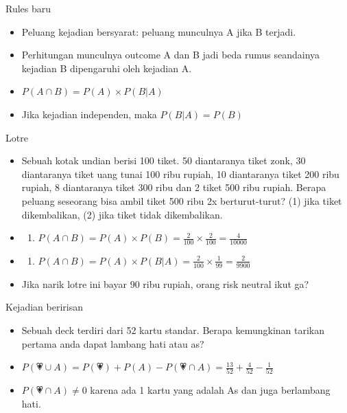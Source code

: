 \documentclass[
  ignorenonframetext,
]{beamer}
\providecommand{\tightlist}{%
  \setlength{\itemsep}{0pt}\setlength{\parskip}{0pt}}\usepackage{longtable,booktabs,array}
\begin{document}
\begin{frame}{Rules baru}
\label{rules-baru-1}
\begin{itemize}[<+->]
\item
  Peluang kejadian bersyarat: peluang munculnya A jika B terjadi.
\item
  Perhitungan munculnya outcome A dan B jadi beda rumus seandainya
  kejadian B dipengaruhi oleh kejadian A.
\item
  \(P(A \cap B)=P(A) \times P(B|A)\)
\item
  Jika kejadian independen, maka \(P(B|A)= P(B)\)
\end{itemize}
\end{frame}

\begin{frame}{Lotre}
\label{lotre}
\begin{itemize}[<+->]
\item
  Sebuah kotak undian berisi 100 tiket. 50 diantaranya tiket zonk, 30
  diantaranya tiket uang tunai 100 ribu rupiah, 10 diantaranya tiket 200
  ribu rupiah, 8 diantaranya tiket 300 ribu dan 2 tiket 500 ribu rupiah.
  Berapa peluang seseorang bisa ambil tiket 500 ribu 2x berturut-turut?
  (1) jika tiket dikembalikan, (2) jika tiket tidak dikembalikan.
\item
  \begin{enumerate}[<+->]
  [(1)]
  \tightlist
  \item
    \(P(A \cap B)=P(A) \times P(B)= \frac{2}{100} \times \frac{2}{100} = \frac{4}{10000}\)
  \end{enumerate}
\item
  \begin{enumerate}[<+->]
  [(1)]
  \setcounter{enumi}{1}
  \tightlist
  \item
    \(P(A \cap B)=P(A) \times P(B|A)= \frac{2}{100} \times \frac{1}{99} = \frac{2}{9900}\)
  \end{enumerate}
\item
  Jika narik lotre ini bayar 90 ribu rupiah, orang risk neutral ikut ga?
\end{itemize}
\end{frame}

\begin{frame}{Kejadian beririsan}
\label{kejadian-beririsan}
\begin{itemize}[<+->]
\item
  Sebuah deck terdiri dari 52 kartu standar. Berapa kemungkinan tarikan
  pertama anda dapat lambang hati atau as?
\item
  \(P(💗 \cup A)=P(💗)+P(A)-P(💗 \cap A)=\frac{13}{52}+\frac{4}{52}-\frac{1}{52}\)
\item
  \(P(💗 \cap A) \neq 0\) karena ada 1 kartu yang adalah As dan juga
  berlambang hati.
\end{itemize}
\end{frame}
\end{document}
